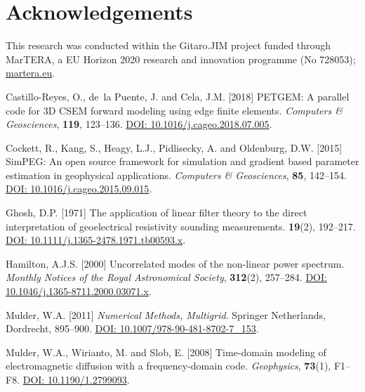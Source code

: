 \documentclass{eage2020}
\begin{document}
\section{Acknowledgements}

This research was conducted within the Gitaro.JIM project funded through
MarTERA, a EU Horizon 2020 research and innovation programme (No 728053);
\href{https://www.martera.eu}{martera.eu}.

\begin{thebibliography}{11}
\providecommand{\natexlab}[1]{#1}

Castillo-Reyes, O., de~la Puente, J. and Cela, J.M. [2018] {PETGEM}: {A}
  parallel code for {3D} {CSEM} forward modeling using edge finite elements.
\newblock \emph{Computers \& Geosciences}, \textbf{119}, 123--136.
\newblock \href{https://doi.org/10.1016/j.cageo.2018.07.005}{DOI:
  10.1016/j.cageo.2018.07.005}.

Cockett, R., Kang, S., Heagy, L.J., Pidlisecky, A. and Oldenburg, D.W. [2015]
  {SimPEG}: {A}n open source framework for simulation and gradient based
  parameter estimation in geophysical applications.
\newblock \emph{Computers \& Geosciences}, \textbf{85}, 142--154.
\newblock \href{https://doi.org/10.1016/j.cageo.2015.09.015}{DOI:
    10.1016/j.cageo.2015.09.015}.

Ghosh, D.P. [1971] The application of linear filter theory to the direct
  interpretation of geoelectrical resistivity sounding measurements.
\newblock \textbf{19}(2), 192--217.
\newblock \href{https://doi.org/10.1111/j.1365-2478.1971.tb00593.x}{DOI:
  10.1111/j.1365-2478.1971.tb00593.x}.

Hamilton, A.J.S. [2000] Uncorrelated modes of the non-linear power spectrum.
\newblock \emph{Monthly Notices of the Royal Astronomical Society},
  \textbf{312}(2), 257--284.
\newblock \href{https://doi.org/10.1046/j.1365-8711.2000.03071.x}{DOI:
  10.1046/j.1365-8711.2000.03071.x}.

Mulder, W.A. [2011] \emph{Numerical Methods, Multigrid}.
\newblock Springer Netherlands, Dordrecht, 895--900.
\newblock \href{https://doi.org/10.1007/978-90-481-8702-7_153}{DOI:
  10.1007/978-90-481-8702-7\_153}.

Mulder, W.A., Wirianto, M. and Slob, E. [2008] Time-domain modeling of
  electromagnetic diffusion with a frequency-domain code.
\newblock \emph{Geophysics}, \textbf{73}(1), F1--F8.
\newblock \href{https://doi.org/10.1190/1.2799093}{DOI: 10.1190/1.2799093}.


\end{thebibliography}
\end{document}

